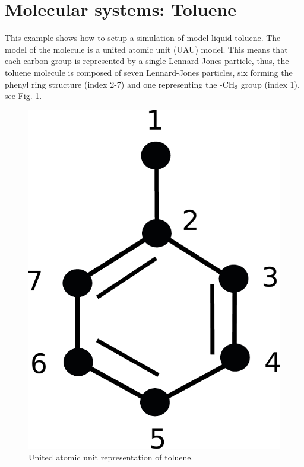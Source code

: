 \documentclass[11pt]{article}
\begin{document}
\section{Molecular systems: Toluene}
This example shows how to setup a simulation of model liquid toluene. The model
of the molecule is a united atomic unit (UAU) model. This means that each carbon
group is represented by a single Lennard-Jones particle, thus, the toluene
molecule is composed of seven Lennard-Jones particles, six forming the phenyl
ring structure (index 2-7) and one representing the -CH$_3$ group (index 1), see
Fig. \ref{fig:toluene}.
\begin{figure}[h]
  \begin{center}
    \includegraphics[scale=.4]{toluene.pdf}
  \caption{
    \label{fig:toluene}
    United atomic unit representation of toluene.
  }
  \end{center}
\end{figure}
\end{document}

